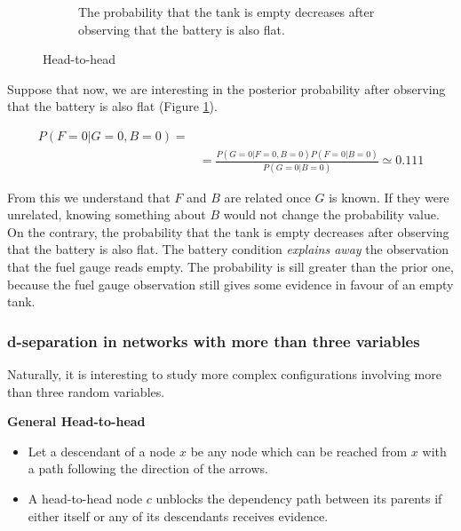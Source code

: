 \begin{figure}
\begin{subfigure}[t]{0.32\textwidth}
\caption{The probability that the tank is empty decreases after observing that the battery is also flat.}
\label{fig:fuelExampleSelectedPart2}
\end{subfigure}

\caption{Head-to-head}
\label{fig:head-to-head-example}
\end{figure}

Suppose that now, we are interesting in the posterior probability after observing that the battery is also flat (Figure \ref{fig:fuelExampleSelectedPart2}).

\begin{align*}
P(F=0 | G=0, B=0) = \\
&=\frac{P(G=0|F=0,B=0)P(F=0|B=0)}{P(G=0|B=0)} \simeq 0.111
\end{align*}

From this we understand that $F$ and $B$ are related once $G$ is known. If they were unrelated, knowing something about $B$ would not change the probability value. On the contrary, the probability that the tank is empty decreases after observing that the battery is also flat. The battery condition \textit{explains away} the observation that the fuel gauge reads empty. The probability is sill greater than the prior one, because the fuel gauge observation still gives some evidence in favour of an empty tank.

\subsubsection{d-separation in networks with more than three variables}
Naturally, it is interesting to study more complex configurations involving more than three random variables. \newline

\textbf{General Head-to-head}
\begin{itemize}
    \item Let a descendant of a node $x$ be any node which can be reached from $x$ with a path following the direction of the arrows.
    \item A head-to-head node $c$ unblocks the dependency path between its parents if either itself or any of its descendants receives evidence.
\end{itemize}

